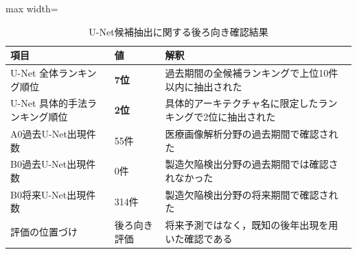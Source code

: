 \begin{table}[tbp]
\centering
\small
\caption{U-Net候補抽出に関する後ろ向き確認結果}
\label{tab:experiment1_evaluation_summary_table}
\begin{adjustbox}{max width=\textwidth}
\begin{tabular}{lll}
\toprule
項目 & 値 & 解釈 \\
\midrule
U-Net 全体ランキング順位         & \textbf{7位}  & 過去期間の全候補ランキングで上位10件以内に抽出された \\
U-Net 具体的手法ランキング順位     & \textbf{2位}  & 具体的アーキテクチャ名に限定したランキングで2位に抽出された \\
A0過去U-Net出現件数            & 55件          & 医療画像解析分野の過去期間で確認された \\
B0過去U-Net出現件数            & 0件           & 製造欠陥検出分野の過去期間では確認されなかった \\
B0将来U-Net出現件数            & 314件         & 製造欠陥検出分野の将来期間で確認された \\
評価の位置づけ                  & 後ろ向き評価 & 将来予測ではなく，既知の後年出現を用いた確認である \\
\bottomrule
\end{tabular}
\end{adjustbox}
\end{table}
